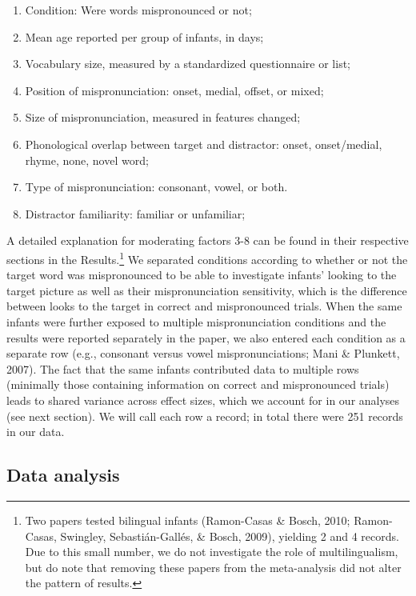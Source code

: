 \documentclass[man]{apa6}
\providecommand{\tightlist}{%
  \setlength{\itemsep}{0pt}\setlength{\parskip}{0pt}}
\let\rmarkdownfootnote\footnote%
\def\footnote{\protect\rmarkdownfootnote}
\begin{document}
\begin{enumerate}
\def\labelenumi{\arabic{enumi}.}
\tightlist
\item
  Condition: Were words mispronounced or not;\\
\item
  Mean age reported per group of infants, in days;\\
\item
  Vocabulary size, measured by a standardized questionnaire or list;\\
\item
  Position of mispronunciation: onset, medial, offset, or mixed;
\item
  Size of mispronunciation, measured in features changed;
\item
  Phonological overlap between target and distractor: onset, onset/medial, rhyme, none, novel word;
\item
  Type of mispronunciation: consonant, vowel, or both.
\item
  Distractor familiarity: familiar or unfamiliar;
\end{enumerate}

A detailed explanation for moderating factors 3-8 can be found in their respective sections in the Results.\footnote{Two papers tested bilingual infants (Ramon-Casas \& Bosch, 2010; Ramon-Casas, Swingley, Sebastián-Gallés, \& Bosch, 2009), yielding 2 and 4 records. Due to this small number, we do not investigate the role of multilingualism, but do note that removing these papers from the meta-analysis did not alter the pattern of results.} We separated conditions according to whether or not the target word was mispronounced to be able to investigate infants' looking to the target picture as well as their mispronunciation sensitivity, which is the difference between looks to the target in correct and mispronounced trials. When the same infants were further exposed to multiple mispronunciation conditions and the results were reported separately in the paper, we also entered each condition as a separate row (e.g., consonant versus vowel mispronunciations; Mani \& Plunkett, 2007). The fact that the same infants contributed data to multiple rows (minimally those containing information on correct and mispronounced trials) leads to shared variance across effect sizes, which we account for in our analyses (see next section). We will call each row a record; in total there were 251 records in our data.

\hypertarget{data-analysis}{%
\subsection{Data analysis}\label{data-analysis}}
\end{document}
